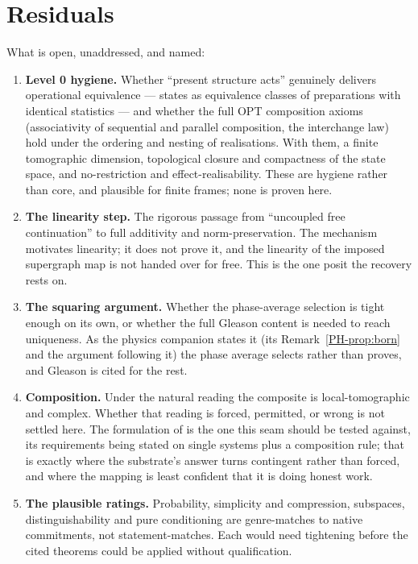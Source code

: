 \documentclass[11pt,a4paper]{article}
\theoremstyle{remark}\newtheorem{remark}[definition]{Remark}
\begin{document}
\section{Residuals}\label{sec:residuals}
What is open, unaddressed, and named:

\begin{enumerate}[leftmargin=*]
\item \textbf{Level 0 hygiene.} Whether ``present structure acts'' genuinely
delivers operational equivalence --- states as equivalence classes of preparations
with identical statistics --- and whether the full OPT composition axioms
(associativity of sequential and parallel composition, the interchange law) hold
under the ordering and nesting of realisations. With them, a finite tomographic
dimension, topological closure and compactness of the state space, and
no-restriction and effect-realisability. These are hygiene rather than core, and
plausible for finite frames; none is proven here.
\item \textbf{The linearity step.} The rigorous passage from ``uncoupled free
continuation'' to full additivity and norm-preservation. The mechanism motivates
linearity; it does not prove it, and the linearity of the imposed supergraph map
is not handed over for free. This is the one posit the recovery rests on.
\item \textbf{The squaring argument.} Whether the phase-average selection is tight
enough on its own, or whether the full Gleason content is needed to reach
uniqueness. As the physics companion states it (its Remark~\ref{PH-prop:born}
and the argument following it) the phase average selects rather than proves, and
Gleason is cited for the rest.
\item \textbf{Composition.} Under the natural reading the composite is
local-tomographic and complex. Whether that reading is forced, permitted, or
wrong is not settled here. The formulation of \citet{masanes2011} is the one this
seam should be tested against, its requirements being stated on single systems
plus a composition rule; that is exactly where the substrate's answer turns
contingent rather than forced, and where the mapping is least confident that it is
doing honest work.
\item \textbf{The plausible ratings.} Probability, simplicity and compression,
subspaces, distinguishability and pure conditioning are genre-matches to native
commitments, not statement-matches. Each would need tightening before the cited
theorems could be applied without qualification.
\end{enumerate}
\end{document}

